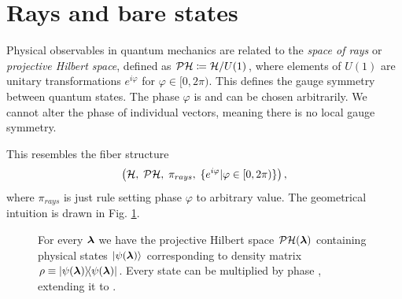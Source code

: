 \section{Rays and bare states}
Physical observables in quantum mechanics are related to the \emph{space of rays} or \emph{projective Hilbert space}, defined as $\mathcal{P}\mathcal{H}\coloneqq \mathcal{H}/U(1)$, where elements of $U(1)$ are unitary transformations $e^{i\varphi}$ for $\varphi\in[0,2\pi)$. This defines the  gauge symmetry between quantum states. The phase $\varphi$ is  and can be chosen arbitrarily. We cannot alter the phase of individual vectors, meaning there is no local gauge symmetry. 

This resembles the fiber structure
$$\left(\mathcal{H},\;\mathcal{P}\mathcal{H},\;\pi_{rays},\;\{e^{i\varphi}| \varphi\in[0,2\pi)\}\right),$$
where $\pi_{rays}$ is just rule setting phase $\varphi$ to arbitrary value. The geometrical intuition is drawn in Fig. \ref{fig:projectiveHilbertSpace}.



\begin{figure}[h]
    \centering
\caption{For every ${\bm\lambda}$ we have the projective Hilbert space $\mathcal{P}\mathcal{H}({\bm\lambda})$ containing physical states $\ket{\psi({\bm\lambda})}$ corresponding to density matrix $\rho\equiv\ket{\psi({\bm\lambda})}\!\!\bra{\psi({\bm\lambda})}$. Every state can be multiplied by phase , extending it to .}
    \label{fig:projectiveHilbertSpace}
\end{figure}







